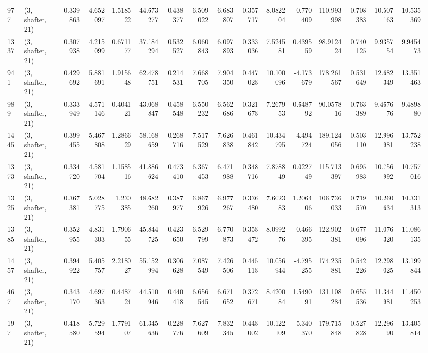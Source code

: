 \begin{tabular}{llrrrrrrrrrrrrrr}
977  &  (3, shafter, 21) &   0.339863 &   4.652097 &   1.518522 &     44.673277 &    0.438377 &    6.509022 &    6.683807 &  0.357717 &   8.082204 &  -0.770409 &   110.993998 &   0.708383 &  10.507163 &  10.535369 \\
1337 &  (3, shafter, 21) &   0.307938 &   4.215099 &   0.671177 &     37.184294 &    0.532527 &    6.060843 &    6.097893 &  0.333036 &   7.524581 &   0.439559 &    98.912424 &   0.740125 &   9.935754 &   9.945473 \\
941  &  (3, shafter, 21) &   0.429692 &   5.881691 &   1.915648 &     62.478751 &    0.214531 &    7.668705 &    7.904350 &  0.447028 &  10.100096 &  -4.173679 &   178.261567 &   0.531649 &  12.682349 &  13.351463 \\
989  &  (3, shafter, 21) &   0.333949 &   4.571146 &   0.404121 &     43.068847 &    0.458548 &    6.550232 &    6.562686 &  0.321678 &   7.267953 &   0.648792 &    90.057816 &   0.763389 &   9.467676 &   9.489880 \\
1445 &  (3, shafter, 21) &   0.399455 &   5.467808 &   1.286629 &     58.168659 &    0.268716 &    7.517529 &    7.626838 &  0.461842 &  10.434795 &  -4.494724 &   189.124056 &   0.503110 &  12.996981 &  13.752238 \\
1373 &  (3, shafter, 21) &   0.334720 &   4.581704 &   1.158516 &     41.886624 &    0.473410 &    6.367453 &    6.471988 &  0.348716 &   7.878849 &   0.022749 &   115.713397 &   0.695983 &  10.756992 &  10.757016 \\
1325 &  (3, shafter, 21) &   0.367381 &   5.028775 &  -1.230385 &     48.682260 &    0.387977 &    6.867926 &    6.977267 &  0.336480 &   7.602383 &   1.206406 &   106.736033 &   0.719570 &  10.260634 &  10.331313 \\
1385 &  (3, shafter, 21) &   0.352955 &   4.831303 &   1.790655 &     45.844725 &    0.423650 &    6.529799 &    6.770873 &  0.358472 &   8.099276 &  -0.466395 &   122.902381 &   0.677096 &  11.076320 &  11.086135 \\
1457 &  (3, shafter, 21) &   0.394922 &   5.405757 &   2.218027 &     55.152994 &    0.306628 &    7.087549 &    7.426506 &  0.445118 &  10.056944 &  -4.795255 &   174.235881 &   0.542226 &  12.298025 &  13.199844 \\
467  &  (3, shafter, 21) &   0.343170 &   4.697363 &   0.448724 &     44.510946 &    0.440418 &    6.656545 &    6.671652 &  0.372671 &   8.420084 &   1.549091 &   131.108284 &   0.655536 &  11.344981 &  11.450253 \\
197  &  (3, shafter, 21) &   0.418580 &   5.729594 &   1.779107 &     61.345636 &    0.228776 &    7.627609 &    7.832345 &  0.448002 &  10.122109 &  -5.340370 &   179.715848 &   0.527828 &  12.296190 &  13.405814 \\

\end{tabular}
